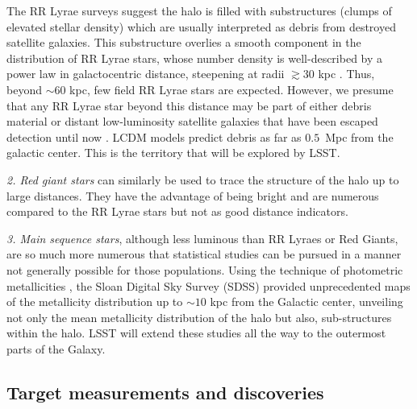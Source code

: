 The RR Lyrae surveys suggest the halo is filled with substructures
(clumps of elevated stellar density) which are usually interpreted as
debris from destroyed satellite galaxies. This substructure overlies a
smooth component in the distribution of RR Lyrae stars, whose number density is well-described by a power law in galactocentric distance,
steepening at radii $\gtrsim 30$ kpc \citep{zinn14}.  Thus, beyond
$\sim 60$ kpc, few field RR Lyrae stars are expected. However, we
presume that any RR Lyrae star beyond this distance may be part of
either debris material or distant low-luminosity satellite galaxies
that have been escaped detection until now \citep{sesar14,baker15}.
LCDM models predict debris as far as $0.5$~Mpc from the galactic
center. This is the territory that will be explored by LSST.

{\it 2. Red giant stars} can similarly be used to trace the structure
of the halo up to large distances. They have the advantage of being
bright and are numerous compared to the RR Lyrae stars but not as good
distance indicators.

{\it 3. Main sequence stars}, although less luminous than RR Lyraes or
Red Giants, are so much more numerous that statistical studies can be
pursued in a manner not generally possible for those populations.
Using the technique of photometric metallicities \citep{ivezic08}, the
Sloan Digital Sky Survey (SDSS) provided unprecedented maps of the
metallicity distribution up to $\sim 10$ kpc from the Galactic center,
unveiling not only the mean metallicity distribution of the halo but
also, sub-structures within the halo. LSST will extend these studies
all the way to the outermost parts of the Galaxy.


\subsection{Target measurements and discoveries}
\label{sec:\secname:MW_Halo_targets}

